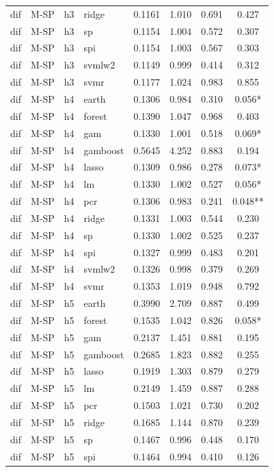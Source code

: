 \begin{ThreePartTable}
\begin{longtable}[t]{llclcccc}
dif & M-SP & h3 & ridge & 0.1161 & 1.010 & 0.691 & 0.427\\
dif & M-SP & h3 & sp & 0.1154 & 1.004 & 0.572 & 0.307\\
dif & M-SP & h3 & spi & 0.1154 & 1.003 & 0.567 & 0.303\\
dif & M-SP & h3 & svmlw2 & 0.1149 & 0.999 & 0.414 & 0.312\\
dif & M-SP & h3 & svmr & 0.1177 & 1.024 & 0.983 & 0.855\\
\addlinespace
dif & M-SP & h4 & earth & 0.1306 & 0.984 & 0.310 & 0.056*\\
dif & M-SP & h4 & forest & 0.1390 & 1.047 & 0.968 & 0.403\\
dif & M-SP & h4 & gam & 0.1330 & 1.001 & 0.518 & 0.069*\\
dif & M-SP & h4 & gamboost & 0.5645 & 4.252 & 0.883 & 0.194\\
dif & M-SP & h4 & lasso & 0.1309 & 0.986 & 0.278 & 0.073*\\
dif & M-SP & h4 & lm & 0.1330 & 1.002 & 0.527 & 0.056*\\
dif & M-SP & h4 & pcr & 0.1306 & 0.983 & 0.241 & 0.048**\\
dif & M-SP & h4 & ridge & 0.1331 & 1.003 & 0.544 & 0.230\\
dif & M-SP & h4 & sp & 0.1330 & 1.002 & 0.525 & 0.237\\
dif & M-SP & h4 & spi & 0.1327 & 0.999 & 0.483 & 0.201\\
dif & M-SP & h4 & svmlw2 & 0.1326 & 0.998 & 0.379 & 0.269\\
dif & M-SP & h4 & svmr & 0.1353 & 1.019 & 0.948 & 0.792\\
\addlinespace
dif & M-SP & h5 & earth & 0.3990 & 2.709 & 0.887 & 0.499\\
dif & M-SP & h5 & forest & 0.1535 & 1.042 & 0.826 & 0.058*\\
dif & M-SP & h5 & gam & 0.2137 & 1.451 & 0.881 & 0.195\\
dif & M-SP & h5 & gamboost & 0.2685 & 1.823 & 0.882 & 0.255\\
dif & M-SP & h5 & lasso & 0.1919 & 1.303 & 0.879 & 0.279\\
dif & M-SP & h5 & lm & 0.2149 & 1.459 & 0.887 & 0.288\\
dif & M-SP & h5 & pcr & 0.1503 & 1.021 & 0.730 & 0.202\\
dif & M-SP & h5 & ridge & 0.1685 & 1.144 & 0.870 & 0.239\\
dif & M-SP & h5 & sp & 0.1467 & 0.996 & 0.448 & 0.170\\
dif & M-SP & h5 & spi & 0.1464 & 0.994 & 0.410 & 0.126\\

\end{longtable}
\end{ThreePartTable}
